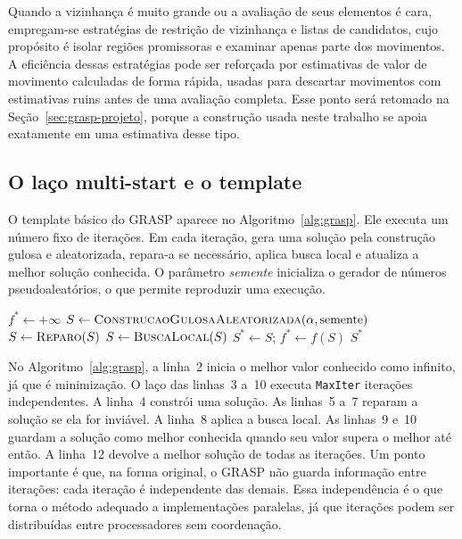 \documentclass[11pt,a4paper]{article}
\newcommand{\code}[1]{\texttt{#1}}
\begin{document}
Quando a vizinhança é muito grande ou a avaliação de seus elementos é cara, empregam-se estratégias de restrição de vizinhança e listas de candidatos, cujo propósito é isolar regiões promissoras e examinar apenas parte dos movimentos. A eficiência dessas estratégias pode ser reforçada por estimativas de valor de movimento calculadas de forma rápida, usadas para descartar movimentos com estimativas ruins antes de uma avaliação completa. Esse ponto será retomado na Seção~\ref{sec:grasp-projeto}, porque a construção usada neste trabalho se apoia exatamente em uma estimativa desse tipo.

\subsection{O laço multi-start e o template}

O template básico do GRASP aparece no Algoritmo~\ref{alg:grasp}. Ele executa um número fixo de iterações. Em cada iteração, gera uma solução pela construção gulosa e aleatorizada, repara-a se necessário, aplica busca local e atualiza a melhor solução conhecida. O parâmetro \emph{semente} inicializa o gerador de números pseudoaleatórios, o que permite reproduzir uma execução.

\begin{algorithm}[t]
\caption{Template do GRASP (minimização)}
\label{alg:grasp}
\begin{algorithmic}[1]
  \State $f^\ast \gets +\infty$
    \State $S \gets \Call{ConstrucaoGulosaAleatorizada}{\alpha, \text{semente}}$
      \State $S \gets \Call{Reparo}{S}$
    \EndIf
    \State $S \gets \Call{BuscaLocal}{S}$
      \State $S^\ast \gets S$; \quad $f^\ast \gets f(S)$
    \EndIf
  \EndFor
  \State \Return $S^\ast$
\EndProcedure
\end{algorithmic}
\end{algorithm}

No Algoritmo~\ref{alg:grasp}, a linha~2 inicia o melhor valor conhecido como infinito, já que é minimização. O laço das linhas~3 a~10 executa \code{MaxIter} iterações independentes. A linha~4 constrói uma solução. As linhas~5 a~7 reparam a solução se ela for inviável. A linha~8 aplica a busca local. As linhas~9 e~10 guardam a solução como melhor conhecida quando seu valor supera o melhor até então. A linha~12 devolve a melhor solução de todas as iterações. Um ponto importante é que, na forma original, o GRASP não guarda informação entre iterações: cada iteração é independente das demais. Essa independência é o que torna o método adequado a implementações paralelas, já que iterações podem ser distribuídas entre processadores sem coordenação.
\end{document}
